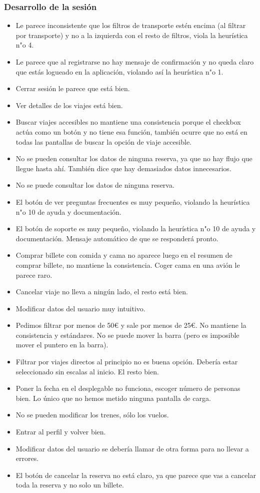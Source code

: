 \subsubsection{Desarrollo de la sesión}\label{sec:sesiones}
\begin{itemize}
    \item Le parece inconsistente que los filtros de transporte estén encima (al filtrar por transporte) y no a la izquierda con el resto de filtros, 
    viola la heurística n"o 4.
    \item Le parece que al registrarse no hay mensaje de confirmación y no queda claro que estás logueado en la aplicación, violando así la heurística n"o 1.
    \item Cerrar sesión le parece que está bien.
    \item Ver detalles de los viajes está bien. 
    \item Buscar viajes accesibles no mantiene una consistencia porque el checkbox actúa como un botón y no tiene esa función, también ocurre que no está en todas las 
    pantallas de buscar la opción de viaje accesible. 
    \item No se pueden consultar los datos de ninguna reserva, ya que no hay flujo que llegue hasta ahí. También dice que hay demasiados datos innecesarios.
    \item No se puede consultar los datos de ninguna reserva.
    \item El botón de ver preguntas frecuentes es muy pequeño, violando la heurística n"o 10 de ayuda y documentación.
    \item El botón de soporte es muy pequeño, violando la heurística n"o 10 de ayuda y documentación. Mensaje automático de que se responderá pronto.
    \item Comprar billete con comida y cama no aparece luego en el resumen de comprar billete, no mantiene la consistencia. Coger cama en una avión le parece raro.
    \item Cancelar viaje no lleva a ningún lado, el resto está bien.
    \item Modificar datos del usuario muy intuitivo.
    \item Pedimos filtrar por menos de 50€ y sale por menos de 25€. No mantiene la consistencia y estándares. No se puede mover la barra (pero es imposible 
    mover el puntero en la barra).
    \item Filtrar por viajes directos al principio no es buena opción. Debería estar seleccionado sin escalas al inicio. El resto bien. 
    \item Poner la fecha en el desplegable no funciona, escoger número de personas bien. Lo único que no hemos metido ninguna pantalla de carga. 
    \item No se pueden modificar los trenes, sólo los vuelos.
    \item Entrar al perfil y volver bien. 
    \item Modificar datos del usuario se debería llamar de otra forma para no llevar a errores.
    \item El botón de cancelar la reserva no está claro, ya que parece que vas a cancelar toda la reserva y no solo un billete. 
\end{itemize}


